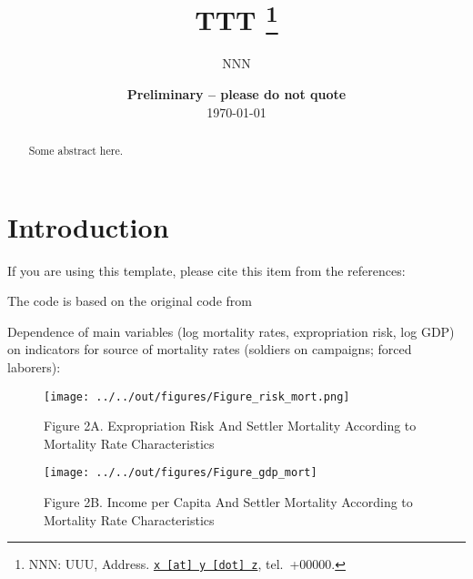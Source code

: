 \documentclass[11pt, a4paper, leqno]{article}
\begin{document}
\title{TTT
\thanks{NNN: UUU, Address. \href{mailto:x@y.z} {\nolinkurl{x [at] y [dot] z}}, tel.~+00000.}
}

\author{NNN
}

\date{
{\bf Preliminary -- please do not quote} 
\\[1ex] 
\today
}

\maketitle

\begin{abstract}
	Some abstract here.
\end{abstract}
\clearpage

\section{Introduction} %
\label{sec:introduction}

If you are using this template, please cite this item from the references: \citet{Gaudecker13}

The code is based on the original code from \citet{Albouy2012}

Dependence of main variables (log mortality rates, expropriation risk, log GDP) on indicators for source of mortality rates (soldiers on campaigns; forced laborers):

\clearpage

\begin{figure} 
	\centering   
	\texttt{[image: ../../out/figures/Figure\_risk\_mort.png]}
     \caption*{
     		   Figure 2A. Expropriation Risk And Settler Mortality According to\\ 
     		   Mortality Rate Characteristics
     }
\end{figure}

\begin{figure}[h!]
		\centering
	    \texttt{[image: ../../out/figures/Figure\_gdp\_mort]} 
 	     \caption*{
 	     		   Figure 2B. Income per Capita And Settler Mortality According to\\ 
 	     		   Mortality Rate Characteristics
 	     }
\end{figure}
\end{document}
